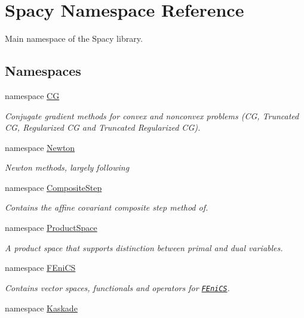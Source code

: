 \hypertarget{namespaceSpacy}{\section{\-Spacy \-Namespace \-Reference}
\label{namespaceSpacy}
}


\-Main namespace of the \-Spacy library.  


\subsection*{\-Namespaces}
\begin{DoxyCompactItemize}
\item 
namespace \hyperlink{namespaceSpacy_1_1CG}{\-C\-G}
\begin{DoxyCompactList}\small\item\em \-Conjugate gradient methods for convex and nonconvex problems (\-C\-G, \-Truncated \-C\-G, \-Regularized \-C\-G and \-Truncated \-Regularized \-C\-G). \end{DoxyCompactList}\item 
namespace \hyperlink{namespaceSpacy_1_1Newton}{\-Newton}
\begin{DoxyCompactList}\small\item\em \-Newton methods, largely following \end{DoxyCompactList}\item 
namespace \hyperlink{namespaceSpacy_1_1CompositeStep}{\-Composite\-Step}
\begin{DoxyCompactList}\small\item\em \-Contains the affine covariant composite step method of. \end{DoxyCompactList}\item 
namespace \hyperlink{namespaceSpacy_1_1ProductSpace}{\-Product\-Space}
\begin{DoxyCompactList}\small\item\em \-A product space that supports distinction between primal and dual variables. \end{DoxyCompactList}\item 
namespace \hyperlink{namespaceSpacy_1_1FEniCS}{\-F\-Eni\-C\-S}
\begin{DoxyCompactList}\small\item\em \-Contains vector spaces, functionals and operators for \href{www.fenicsproject.org}{\tt \-F\-Eni\-C\-S}. \end{DoxyCompactList}\item 
namespace \hyperlink{namespaceSpacy_1_1Kaskade}{\-Kaskade}

\end{DoxyCompactItemize}
